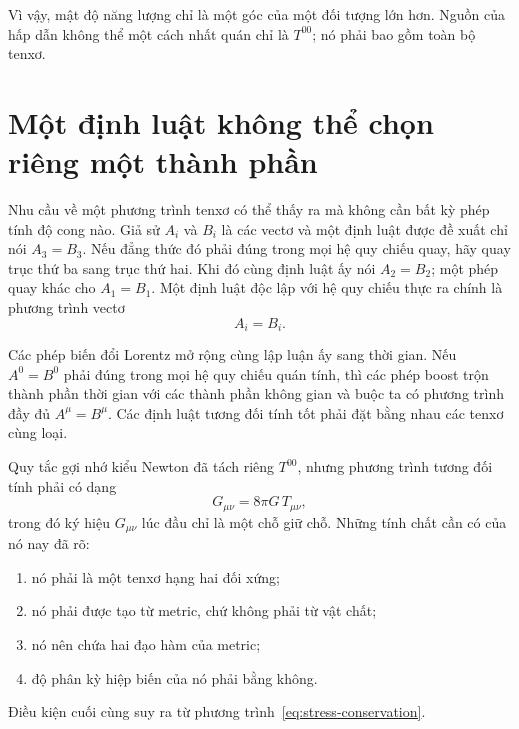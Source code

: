 \begin{classroomqa}
\end{classroomqa}

Vì vậy, mật độ năng lượng chỉ là một góc của một đối tượng lớn hơn. Nguồn của hấp dẫn không thể một cách nhất quán chỉ là \(T^{00}\); nó phải bao gồm toàn bộ tenxơ.

\section{Một định luật không thể chọn riêng một thành phần}

Nhu cầu về một phương trình tenxơ có thể thấy ra mà không cần bất kỳ phép tính độ cong nào. Giả sử \(A_i\) và \(B_i\) là các vectơ và một định luật được đề xuất chỉ nói \(A_3=B_3\). Nếu đẳng thức đó phải đúng trong mọi hệ quy chiếu quay, hãy quay trục thứ ba sang trục thứ hai. Khi đó cùng định luật ấy nói \(A_2=B_2\); một phép quay khác cho \(A_1=B_1\). Một định luật độc lập với hệ quy chiếu thực ra chính là phương trình vectơ
\begin{equation}
 A_i=B_i.
\end{equation}

Các phép biến đổi Lorentz mở rộng cùng lập luận ấy sang thời gian. Nếu \(A^0=B^0\) phải đúng trong mọi hệ quy chiếu quán tính, thì các phép boost trộn thành phần thời gian với các thành phần không gian và buộc ta có phương trình đầy đủ \(A^\mu=B^\mu\). Các định luật tương đối tính tốt phải đặt bằng nhau các tenxơ cùng loại.

Quy tắc gợi nhớ kiểu Newton đã tách riêng \(T^{00}\), nhưng phương trình tương đối tính phải có dạng
\begin{equation}
 G_{\mu\nu}=8\pi G\,T_{\mu\nu},
 \label{eq:field-schematic}
\end{equation}
trong đó ký hiệu \(G_{\mu\nu}\) lúc đầu chỉ là một chỗ giữ chỗ. Những tính chất cần có của nó nay đã rõ:
\begin{enumerate}
 \item nó phải là một tenxơ hạng hai đối xứng;
 \item nó phải được tạo từ metric, chứ không phải từ vật chất;
 \item nó nên chứa hai đạo hàm của metric;
 \item độ phân kỳ hiệp biến của nó phải bằng không.
\end{enumerate}
Điều kiện cuối cùng suy ra từ phương trình~\eqref{eq:stress-conservation}.

